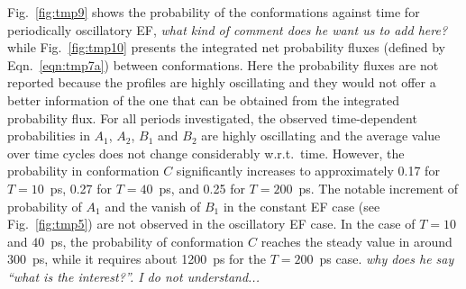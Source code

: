 \documentclass[a4paper,preprint,unsortedaddress,onecolumn]{revtex4-1}
\newcommand{\recheck}[1]{{\color{red} #1}}
\newcommand{\bluec}[1]{{\color{blue} #1}}
\begin{document}
Fig.~\ref{fig:tmp9} shows the probability of the
conformations against time for periodically oscillatory EF,
\bluec{\textit{what kind of comment does he want us to add here?}}
while  
Fig.~\ref{fig:tmp10} presents the integrated net probability fluxes
(defined by Eqn.~\eqref{eqn:tmp7a}) between
conformations. Here the probability fluxes are not reported
because the profiles are highly oscillating and they would not offer 
a better information of the one that can be obtained from the integrated probability flux.
For all periods investigated,
the observed time-dependent probabilities  in $A_1$, $A_2$, $B_1$ and $B_2$ are
highly oscillating and the average value over time cycles does not change
considerably w.r.t.~time.
However, the probability in conformation $C$ significantly
increases to approximately 0.17 for $T=10$~ps, 0.27 for  $T=40$~ps, and
0.25 for $T=200$~ps.
\recheck{The notable increment of probability of $A_1$ and
  the vanish of $B_1$ in the constant EF case (see Fig.~\ref{fig:tmp5})}
are not observed in the oscillatory EF case.
In the case of $T=10$ and $40$~ps, \recheck{the probability of conformation $C$}
reaches the steady value in around 300~ps, while it requires about 1200~ps
for the $T=200$~ps case.  \bluec{\textit{why does he say ``what is the interest?''. I do not understand...}}
\end{document}
